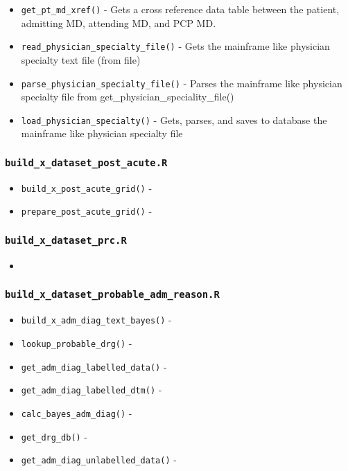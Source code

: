 \documentclass[
]{book}
\providecommand{\tightlist}{%
  \setlength{\itemsep}{0pt}\setlength{\parskip}{0pt}}
\begin{document}
\begin{itemize}
\tightlist
\item
  \texttt{get\_pt\_md\_xref()} - Gets a cross reference data table between the patient, admitting MD, attending MD, and PCP MD.
\item
  \texttt{read\_physician\_specialty\_file()} - Gets the mainframe like physician specialty text file (from file)
\item
  \texttt{parse\_physician\_specialty\_file()} - Parses the mainframe like physician specialty file from get\_physician\_speciality\_file()
\item
  \texttt{load\_physician\_specialty()} - Gets, parses, and saves to database the mainframe like physician specialty file
\end{itemize}

\hypertarget{build_x_dataset_post_acute.r}{%
\subsubsection{\texorpdfstring{\texttt{build\_x\_dataset\_post\_acute.R}}{build\_x\_dataset\_post\_acute.R}}\label{build_x_dataset_post_acute.r}}

\begin{itemize}
\tightlist
\item
  \texttt{build\_x\_post\_acute\_grid()} -
\item
  \texttt{prepare\_post\_acute\_grid()} -
\end{itemize}

\hypertarget{build_x_dataset_prc.r}{%
\subsubsection{\texorpdfstring{\texttt{build\_x\_dataset\_prc.R}}{build\_x\_dataset\_prc.R}}\label{build_x_dataset_prc.r}}

\begin{itemize}
\item
\end{itemize}

\hypertarget{build_x_dataset_probable_adm_reason.r}{%
\subsubsection{\texorpdfstring{\texttt{build\_x\_dataset\_probable\_adm\_reason.R}}{build\_x\_dataset\_probable\_adm\_reason.R}}\label{build_x_dataset_probable_adm_reason.r}}

\begin{itemize}
\tightlist
\item
  \texttt{build\_x\_adm\_diag\_text\_bayes()} -
\item
  \texttt{lookup\_probable\_drg()} -
\item
  \texttt{get\_adm\_diag\_labelled\_data()} -
\item
  \texttt{get\_adm\_diag\_labelled\_dtm()} -
\item
  \texttt{calc\_bayes\_adm\_diag()} -
\item
  \texttt{get\_drg\_db()} -
\item
  \texttt{get\_adm\_diag\_unlabelled\_data()} -
\end{itemize}
\end{document}

